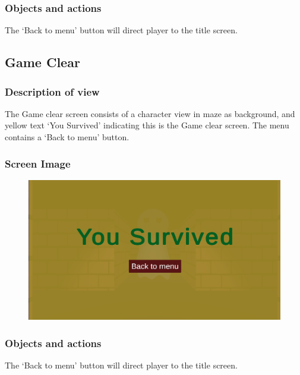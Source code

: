 \documentclass[11pt]{article}
\begin{document}
\subsubsection{Objects and actions}
The `Back to menu' button will direct player to the title screen.
\subsection{Game Clear}
\subsubsection{Description of view}
The Game clear screen consists of a character view in maze as background, and yellow text `You Survived' indicating this is the Game clear screen. The menu contains a `Back to menu' button.
\subsubsection{Screen Image}
\begin{figure}[H]
    \centering
    \includegraphics*[scale=0.2]{UI2.3GameSuccess.png}
\end{figure}
\subsubsection{Objects and actions}
The `Back to menu' button will direct player to the title screen.
\end{document}

